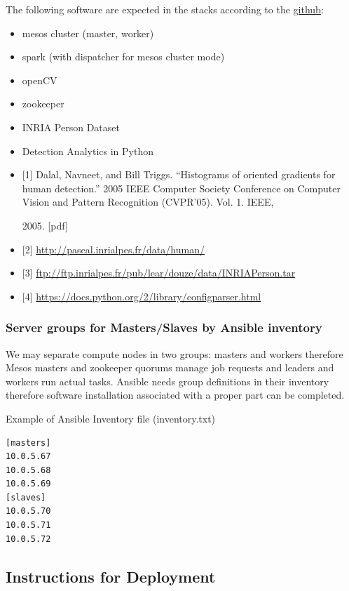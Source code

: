 The following software are expected in the stacks according to the
\href{https://github.com/futuresystems/pedestrian-and-face-detection}{github}:

\begin{itemize}
\tightlist
\item
  mesos cluster (master, worker)
\item
  spark (with dispatcher for mesos cluster mode)
\item
  openCV
\item
  zookeeper
\item
  INRIA Person Dataset
\item
  Detection Analytics in Python
\item
  {[}1{]} Dalal, Navneet, and Bill Triggs. ``Histograms of oriented
  gradients for human detection.'' 2005 IEEE Computer Society Conference
  on Computer Vision and Pattern Recognition (CVPR'05). Vol. 1. IEEE,

  2005. {[}pdf{]}
\item
  {[}2{]} \url{http://pascal.inrialpes.fr/data/human/}
\item
  {[}3{]}
  \url{ftp://ftp.inrialpes.fr/pub/lear/douze/data/INRIAPerson.tar}
\item
  {[}4{]} \url{https://docs.python.org/2/library/configparser.html}
\end{itemize}

\subsubsection{Server groups for Masters/Slaves by Ansible
inventory}\label{server-groups-for-mastersslaves-by-ansible-inventory}

We may separate compute nodes in two groups: masters and workers
therefore Mesos masters and zookeeper quorums manage job requests and
leaders and workers run actual tasks. Ansible needs group definitions in
their inventory therefore software installation associated with a proper
part can be completed.

Example of Ansible Inventory file (inventory.txt)

\begin{verbatim}
[masters]
10.0.5.67
10.0.5.68
10.0.5.69
[slaves]
10.0.5.70
10.0.5.71
10.0.5.72
\end{verbatim}

\subsection{Instructions for
Deployment}\label{instructions-for-deployment}

